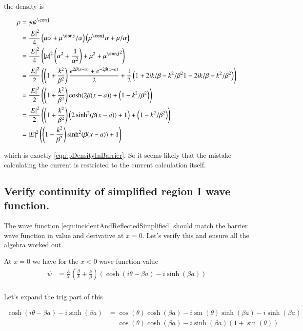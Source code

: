 \documentclass{article}
\begin{document}
the density is

\begin{align*}
\rho 
&=
\psi\psi^\conj \\
&=
\frac{\Abs{E}^2}{4}
\left( \mu \alpha + \mu^\conj/\alpha \right) \left( \mu^\conj \alpha + \mu/\alpha \right) \\
&=
\frac{\Abs{E}^2}{4}
\left( 
\Abs{\mu}^2\left( \alpha^2 + \inv{\alpha^2}\right) 
+ \mu^2
+ {\mu^\conj}^2
\right) \\
&=
\frac{\Abs{E}^2}{2}
\left( 
\left( 1 + \frac{k^2}{\beta^2} \right)\frac{ 
e^{2\beta(x-a)}
+e^{-2\beta(x-a)}
}{2}
+ \inv{2}\left( 
1 + 2 i k/\beta - k^2/\beta^2
1 - 2 i k/\beta - k^2/\beta^2
\right)
\right) \\
&=
\frac{\Abs{E}^2}{2}
\left( 
\left( 1 + \frac{k^2}{\beta^2} \right) \cosh(2\beta(x-a))
+ \left( 
1 - k^2/\beta^2
\right)
\right) \\
&=
\frac{\Abs{E}^2}{2}
\left( 
\left( 1 + \frac{k^2}{\beta^2} \right) \left( 2 \sinh^2(\beta(x-a)) + 1 \right)
+ \left( 
1 - k^2/\beta^2
\right)
\right) \\
&=
\Abs{E}^2
\left( 
\left( 1 + \frac{k^2}{\beta^2} \right) \sinh^2(\beta(x-a)) 
+1 
\right) \\
\end{align*}

which is exactly \ref{eqn:pDensityInBarrier}.  So it seems likely that the mistake calculating the current is restricted to the
current calculation itself.

\subsection{ Verify continuity of simplified region I wave function. }

The wave function \ref{eqn:incidentAndReflectedSimplified}
should match the barrier wave function in value and derivative at
$x=0$.  Let's verify this and ensure all the algebra worked out.

At $x=0$ we have for the $x<0$ wave function value
\begin{align*}
\psi &=
\frac{E}{2} \left(\frac{\beta}{k} + \frac{k}{\beta} \right) 
\left(
\cosh\left( i\theta -\beta a \right) -i \sinh\left( \beta a \right) 
\right) \\
\end{align*}

Let's expand the trig part of this

\begin{align*}
\cosh\left( i\theta -\beta a \right) -i \sinh\left( \beta a \right) 
&=
\cos( \theta ) \cosh(\beta a ) 
-i\sin( \theta ) \sinh(\beta a ) 
-i \sinh( \beta a )  \\
&=
\cos( \theta ) \cosh(\beta a ) 
-i \sinh( \beta a ) (1 + \sin(\theta))
\end{align*}
\end{document}
